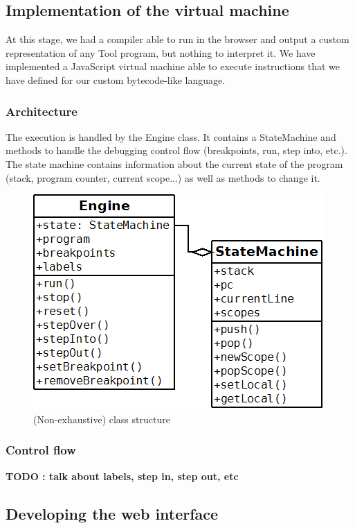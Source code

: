 \subsection{Implementation of the virtual machine}

At this stage, we had a compiler able to run in the browser and output a custom representation of any Tool program, but nothing to interpret it.
We have implemented a JavaScript virtual machine able to execute instructions that we have defined for our custom bytecode-like language.

\subsubsection{Architecture}

The execution is handled by the Engine class. It contains a StateMachine and methods to handle the debugging control flow (breakpoints, run, step into, etc.).
The state machine contains information about the current state of the program (stack, program counter, current scope...) as well as methods to change it.\\

\begin{figure}[h]
  \centering
    \includegraphics[scale=0.6]{diag.png}
     \caption{(Non-exhaustive) class structure}
\end{figure}

\subsubsection{Control flow}

\textbf{TODO : talk about labels, step in, step out, etc}

\subsection{Developing the web interface}

